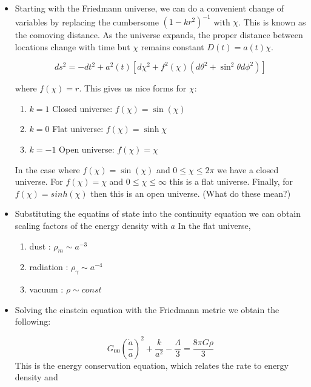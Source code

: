 \documentclass[11pt]{article}
\begin{document}
\begin{itemize}
    \item Starting with the Friedmann universe, we can do a convenient change of variables by replacing the cumbersome \( (1-kr^{2})^{{-1}} \) with \( \chi \). This is known as the comoving distance. As the universe
    expands, the proper distance between locations change with time but \( \chi \) remains constant \( D(t) = a(t)\chi \).
    
    \[ 
        ds^2 = -dt^{2} + a^{2}(t)[d\chi^{2} + f^{2}(\chi)(d\theta^{2} + \sin^{2}{\theta}d\phi^{2})] 
    \]

    where \( f(\chi) = r \). This gives us nice forms for \( \chi \):
    \begin{enumerate}[label = \roman*]
        \item \( k = 1 \) Closed universe: \( f(\chi) = \sin{\left( \chi \right)} \)
        \item \( k = 0 \) Flat universe: \( f(\chi) = \sinh{\chi} \)
        \item \( k = -1 \) Open universe: \( f(\chi) = \chi \)
    \end{enumerate}
    
    
    In the case where \(f(\chi) = \sin{\left( \chi \right)} \) and \( 0 \leq \chi \leq 2\pi \) we have a closed universe. For \( f(\chi) = \chi \) and \( 0 \leq \chi \le \infty \) this
    is a flat universe. Finally, for \( f(\chi) = sinh(\chi) \) then this is an open universe. (What do these mean?)
    

    \item Substituting the equatins of state into the continuity equation we can obtain scaling factors of the energy density with \( a \)
    In the flat universe,

    \begin{enumerate}[label = \roman*]
        \item dust : \( \rho_{m} \sim a^{-3} \)
        \item radiation : \( \rho_{\gamma} \sim a^{-4} \)
        \item vacuum : \( \rho \sim const \)
    \end{enumerate}

    \item Solving the einstein equation with the Friedmann metric we obtain the following:
    
    \[ 
        G_{00}  \left(\frac{\dot{a}}{a}\right)^{2} + \frac{k}{a^{2}} - \frac{\Lambda}{3} = \frac{8\pi G \rho}{3}
    \]
    This is the energy conservation equation, which relates the rate to energy density and


\end{itemize}
\end{document}
